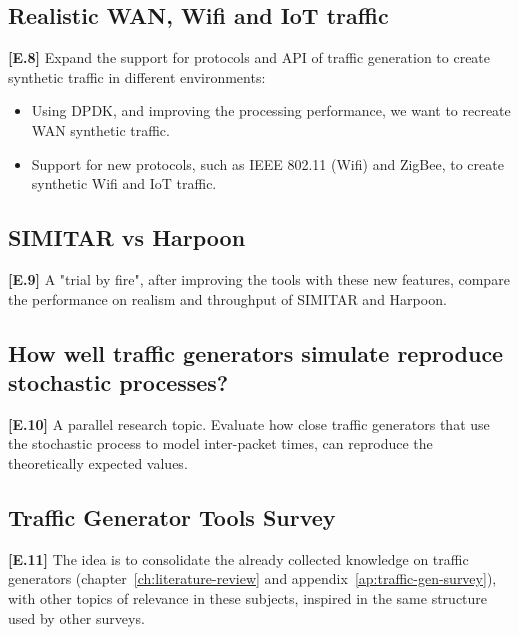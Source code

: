 \subsection{ Realistic WAN, Wifi and IoT traffic}

\textbf{[E.8]} Expand the support for protocols and API of traffic generation to create synthetic traffic in different environments:
\begin{itemize}
\item Using DPDK, and improving the processing performance, we want to recreate WAN synthetic traffic. 
\item Support for new protocols, such as IEEE 802.11 (Wifi) and ZigBee, to create synthetic Wifi and IoT traffic.
\end{itemize}

\subsection{SIMITAR vs Harpoon}

\textbf{[E.9]} A "trial by fire", after improving the tools with these new features, compare the performance on realism and throughput of SIMITAR and Harpoon.

\subsection{How well traffic generators simulate reproduce stochastic processes?}

\textbf{[E.10]} A parallel research topic. Evaluate how close traffic generators that use the stochastic process to model inter-packet times, can reproduce the theoretically expected values. 

\subsection{Traffic Generator Tools Survey}

\textbf{[E.11]} The idea is to consolidate the already collected knowledge on traffic generators (chapter~\ref{ch:literature-review} and appendix~\ref{ap:traffic-gen-survey}), with other topics of relevance in these subjects, inspired in the same structure used by other surveys.